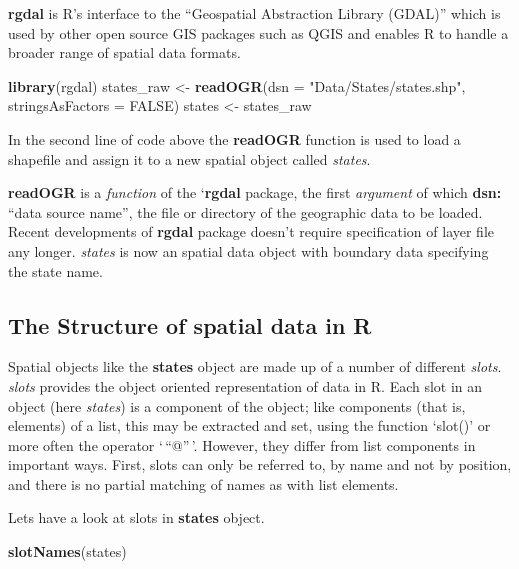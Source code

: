 \documentclass[]{article}
\newenvironment{Shaded}{}{}
\newcommand{\DataTypeTok}[1]{\textcolor[rgb]{0.56,0.13,0.00}{#1}}
\newcommand{\KeywordTok}[1]{\textcolor[rgb]{0.00,0.44,0.13}{\textbf{#1}}}
\newcommand{\NormalTok}[1]{#1}
\newcommand{\OtherTok}[1]{\textcolor[rgb]{0.00,0.44,0.13}{#1}}
\newcommand{\StringTok}[1]{\textcolor[rgb]{0.25,0.44,0.63}{#1}}
\begin{document}
\textbf{rgdal} is R's interface to the ``Geospatial Abstraction Library
(GDAL)'' which is used by other open source GIS packages such as QGIS
and enables R to handle a broader range of spatial data formats.

\begin{Shaded}
\begin{Highlighting}[]
\KeywordTok{library}\NormalTok{(rgdal)}
\NormalTok{states_raw <-}\StringTok{ }\KeywordTok{readOGR}\NormalTok{(}\DataTypeTok{dsn =} \StringTok{"Data/States/states.shp"}\NormalTok{, }\DataTypeTok{stringsAsFactors =} \OtherTok{FALSE}\NormalTok{)}
\NormalTok{states <-}\StringTok{ }\NormalTok{states_raw}
\end{Highlighting}
\end{Shaded}

In the second line of code above the \textbf{readOGR} function is used
to load a shapefile and assign it to a new spatial object called
\emph{states}.

\textbf{readOGR} is a \emph{function} of the `\textbf{rgdal} package,
the first \emph{argument} of which \textbf{dsn:} ``data source name'',
the file or directory of the geographic data to be loaded. Recent
developments of \textbf{rgdal} package doesn't require specification of
layer file any longer. \emph{states} is now an spatial data object with
boundary data specifying the state name.

\hypertarget{the-structure-of-spatial-data-in-r}{%
\subsection{The Structure of spatial data in
R}\label{the-structure-of-spatial-data-in-r}}

Spatial objects like the \textbf{states} object are made up of a number
of different \emph{slots}. \emph{slots} provides the object oriented
representation of data in R. Each slot in an object (here \emph{states})
is a component of the object; like components (that is, elements) of a
list, this may be extracted and set, using the function `slot()' or more
often the operator `\,``@''\,'. However, they differ from list
components in important ways. First, slots can only be referred to, by
name and not by position, and there is no partial matching of names as
with list elements.

Lets have a look at slots in \textbf{states} object.

\begin{Shaded}
\begin{Highlighting}[]
\KeywordTok{slotNames}\NormalTok{(states)}
\end{Highlighting}
\end{Shaded}
\end{document}
